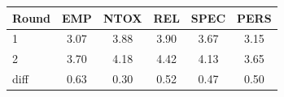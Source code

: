 \begin{tabular}{lccccc}
\toprule
Round & EMP & NTOX & REL & SPEC & PERS \\
\midrule
1 & 3.07 & 3.88 & 3.90 & 3.67 & 3.15 \\
2 & 3.70 & 4.18 & 4.42 & 4.13 & 3.65 \\
diff & 0.63 & 0.30 & 0.52 & 0.47 & 0.50 \\
\bottomrule
\end{tabular}
